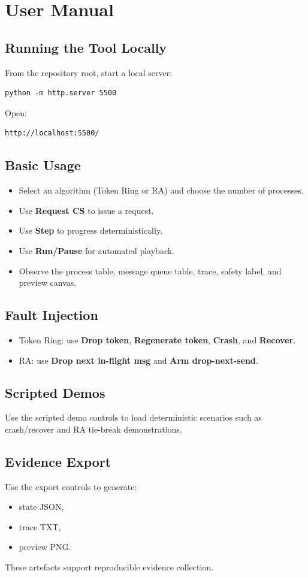 \chapter{User Manual}
\label{app:user-manual}

\section{Running the Tool Locally}
From the repository root, start a local server:
\begin{verbatim}
python -m http.server 5500
\end{verbatim}
Open:
\begin{verbatim}
http://localhost:5500/
\end{verbatim}

\section{Basic Usage}
\begin{itemize}
  \item Select an algorithm (Token Ring or RA) and choose the number of processes.
  \item Use \textbf{Request CS} to issue a request.
  \item Use \textbf{Step} to progress deterministically.
  \item Use \textbf{Run/Pause} for automated playback.
  \item Observe the process table, message queue table, trace, safety label, and preview canvas.
\end{itemize}

\section{Fault Injection}
\begin{itemize}
  \item Token Ring: use \textbf{Drop token}, \textbf{Regenerate token}, \textbf{Crash}, and \textbf{Recover}.
  \item RA: use \textbf{Drop next in-flight msg} and \textbf{Arm drop-next-send}.
\end{itemize}

\section{Scripted Demos}
Use the scripted demo controls to load deterministic scenarios such as crash/recover and RA tie-break demonstrations.

\section{Evidence Export}
Use the export controls to generate:
\begin{itemize}
  \item state JSON,
  \item trace TXT,
  \item preview PNG.
\end{itemize}
These artefacts support reproducible evidence collection.